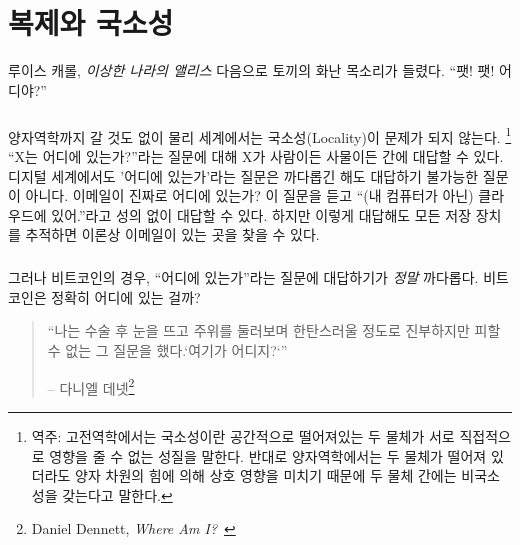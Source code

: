 \chapter{복제와 국소성}
\label{les:3}

\begin{chapquote}{루이스 캐롤, \textit{이상한 나라의 앨리스}}
	다음으로 토끼의 화난 목소리가 들렸다. \enquote{팻! 팻! 어디야?}
\end{chapquote}

\paragraph{}
양자역학까지 갈 것도 없이 물리 세계에서는 국소성(Locality)이 문제가 되지 않는다.
\footnote{역주: 고전역학에서는 국소성이란 공간적으로 떨어져있는 두 물체가 서로 직접적으로 영향을 줄 수 없는 성질을 말한다. 
반대로 양자역학에서는 두 물체가 떨어져 있더라도 양자 차원의 힘에 의해 상호 영향을 미치기 때문에 두 물체 간에는 비국소성을 갖는다고 말한다.}
\enquote{X는 어디에 있는가?}라는 질문에 대해 X가 사람이든 사물이든 간에 대답할 수 있다. 
디지털 세계에서도 '어디에 있는가'라는 질문은 까다롭긴 해도 대답하기 불가능한 질문이 아니다. 
이메일이 진짜로 어디에 있는가? 이 질문을 듣고 \enquote{(내 컴퓨터가 아닌) 클라우드에 있어.}라고 성의 없이 대답할 수 있다.
하지만 이렇게 대답해도 모든 저장 장치를 추적하면 이론상 이메일이 있는 곳을 찾을 수 있다.

\paragraph{}
그러나 비트코인의 경우, \enquote{어디에 있는가}라는 질문에 대답하기가 \textit{정말} 까다롭다. 비트코인은 정확히 어디에 있는 걸까?

\begin{quotation}\begin{samepage}
		\enquote{나는 수술 후 눈을 뜨고 주위를 둘러보며 한탄스러울 정도로 진부하지만 피할 수 없는 그 질문을 했다.`여기가 어디지?`}
		\begin{flushright} -- 다니엘 데넷\footnote{Daniel Dennett, \textit{Where Am I?}~\cite{where-am-i}}
		\end{flushright}
\end{samepage}\end{quotation}

